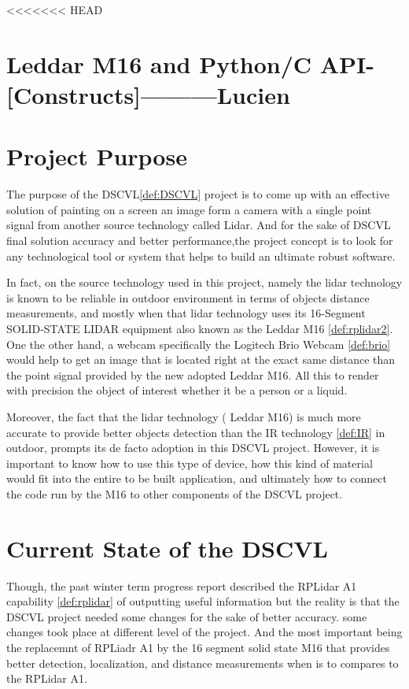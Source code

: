 \documentclass[onecolumn, draftclsnofoot,10pt, compsoc]{IEEEtran}
\begin{document}
\begin{singlespace}
<<<<<<< HEAD
	
	
	\section{ Leddar M16 and Python/C API- [Constructs]---------Lucien}
				
	\section{Project Purpose}
The purpose of the DSCVL\ref{def:DSCVL} project is to come up with an effective solution of painting on a screen an image form a camera with a single point signal from another source technology called Lidar. And for the sake of DSCVL final solution accuracy and better performance,the project concept is to look for any technological tool or system that helps to build an ultimate robust software.

 In fact, on the source technology used in this project, namely the  lidar technology is known to be reliable in outdoor environment in terms of objects distance measurements, and mostly when that lidar technology uses its  16-Segment SOLID-STATE LIDAR equipment also known as the Leddar M16 \ref{def:rplidar2}. One the other hand, a webcam specifically the Logitech Brio Webcam \ref{def:brio} would help to get an image that is located right at the exact same distance than the point signal provided by the new adopted Leddar M16. All this to render with precision the object of interest whether it be a person or a liquid.
 
Moreover, the fact that the lidar technology ( Leddar M16) is much more accurate to provide better objects detection than the IR technology \ref{def:IR} in outdoor, prompts  its de facto adoption in this DSCVL project. However, it is important to know how to use this type of device, how this kind of material would fit into the entire to be built application, and ultimately how to connect the code run by the M16 to other components of the DSCVL project. \par

\section{Current State of the DSCVL}
Though, the past winter term progress report described the RPLidar A1 capability  \ref{def:rplidar} of outputting  useful information but the reality is that the DSCVL project  needed some changes for the sake of better accuracy. some changes took place at different level of the project. And the most important being the replacemnt of RPLiadr A1 by the 16 segment solid state M16 that provides better detection, localization, and distance measurements when is to compares to the RPLidar A1.\par


\end{singlespace}
\end{document}
